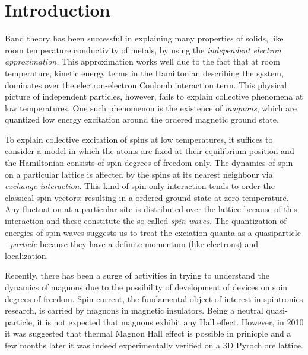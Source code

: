 \chapter{\label{intro}Introduction}
Band theory has been successful in explaining many properties of solids, like room temperature conductivity of metals, by using the \textit{independent electron approximation.} This approximation works well due to the fact that at room temperature, kinetic energy terms in the Hamiltonian describing the system, dominates over the electron-electron Coulomb interaction term. This physical picture of independent particles, however, fails to explain collective phenomena at low temperatures. One such phenomenon is the existence of \textit{magnons}, which are quantized low energy excitation around the ordered magnetic ground state.
 
To explain collective excitation of spins at low temperatures, it suffices to consider
a model in which the atoms are fixed at their equilibrium position and the Hamiltonian consists of spin-degrees of freedom only. The dynamics of spin on a particular lattice is affected by the spins at its nearest neighbour via \textit{exchange interaction}. This kind of spin-only interaction tends to order the classical spin vectors; resulting in a ordered ground state at zero temperature. Any fluctuation at a particular site is distributed over the lattice because of this interaction and these constitute the so-called \textit{spin waves}. The quantization of energies of spin-waves suggests us to treat the exciation quanta as a quasiparticle - \textit{particle} because they have a definite momentum (like electrons) and localization. 

Recently, there has been a surge of activities in trying to understand the dynamics of magnons due to the possibility of development of devices on spin degrees of freedom. Spin current, the fundamental object of interest in spintronics research, is carried by magnons in magnetic insulators. Being a neutral quasi-particle, it is not expected that magnons exhibit any Hall effect. However, in 2010 it was suggested\cite{PhysRevLett.104.066403} that thermal Magnon Hall effect is possible in prinicple and a few months later it was indeed experimentally verified\cite{Onose297} on a 3D Pyrochlore lattice. 


